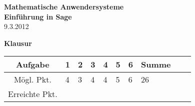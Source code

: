 \usepackage[psamsfonts]{amssymb}
\usepackage{amsmath}
\usepackage[svgnames]{xcolor} %



\parindent0cm 




\begin{center}
\textbf{\LARGE Mathematische Anwendersysteme }\\
\textbf{\LARGE Einführung in Sage}\\
\medskip
9.3.2012
\end{center}

\begin{center}
\Huge \textbf{Klausur}
\end{center}
\bigskip\bigskip\bigskip
\Large
\begin{center}
\begin{tabular}{|Sl||p{0.5cm}|p{0.5cm}|p{0.5cm}|p{0.5cm}|p{0.5cm}|p{0.5cm}||Sc|}
\hline
Aufgabe & \textbf{1} & \textbf{2} & \textbf{3} & \textbf{4} & \textbf{5} & \textbf{6} & \textbf{Summe}\\
\hline
Mögl. Pkt. &  4  & 3  & 4  & 4  & 5  & 6  &  26  \\
\hline
Erreichte Pkt. &    &   &   &   &   &     &    \\
\hline
\end{tabular}
\end{center}

